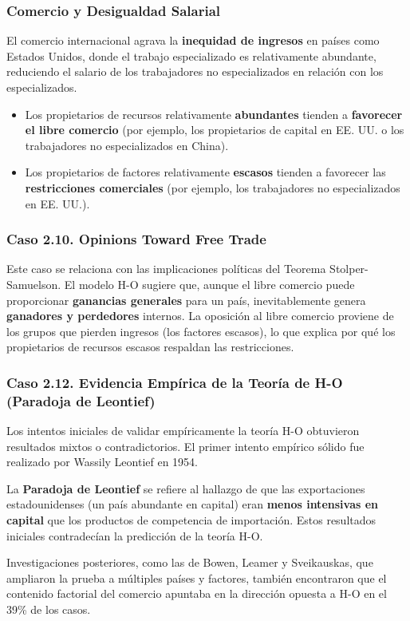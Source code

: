 \subsubsection{Comercio y Desigualdad Salarial}
El comercio internacional agrava la \textbf{inequidad de ingresos} en países como Estados Unidos, donde el trabajo especializado es relativamente abundante, reduciendo el salario de los trabajadores no especializados en relación con los especializados.

\begin{itemize}
    \item Los propietarios de recursos relativamente \textbf{abundantes} tienden a \textbf{favorecer el libre comercio} (por ejemplo, los propietarios de capital en EE. UU. o los trabajadores no especializados en China).
    \item Los propietarios de factores relativamente \textbf{escasos} tienden a favorecer las \textbf{restricciones comerciales} (por ejemplo, los trabajadores no especializados en EE. UU.).
\end{itemize}

\subsubsection{Caso 2.10. Opinions Toward Free Trade}
Este caso se relaciona con las implicaciones políticas del Teorema Stolper-Samuelson. El modelo H-O sugiere que, aunque el libre comercio puede proporcionar \textbf{ganancias generales} para un país, inevitablemente genera \textbf{ganadores y perdedores} internos. La oposición al libre comercio proviene de los grupos que pierden ingresos (los factores escasos), lo que explica por qué los propietarios de recursos escasos respaldan las restricciones.

\subsubsection{Caso 2.12. Evidencia Empírica de la Teoría de H-O (Paradoja de Leontief)}
Los intentos iniciales de validar empíricamente la teoría H-O obtuvieron resultados mixtos o contradictorios. El primer intento empírico sólido fue realizado por Wassily Leontief en 1954.

\begin{definicion}
La \textbf{Paradoja de Leontief} se refiere al hallazgo de que las exportaciones estadounidenses (un país abundante en capital) eran \textbf{menos intensivas en capital} que los productos de competencia de importación. Estos resultados iniciales contradecían la predicción de la teoría H-O.
\end{definicion}
Investigaciones posteriores, como las de Bowen, Leamer y Sveikauskas, que ampliaron la prueba a múltiples países y factores, también encontraron que el contenido factorial del comercio apuntaba en la dirección opuesta a H-O en el 39\% de los casos.


